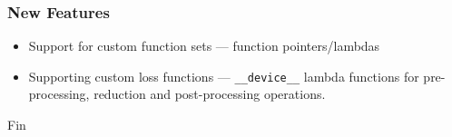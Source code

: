 \documentclass{beamer}
\begin{document}
\begin{frame}
  \frametitle{New Features}
  \begin{itemize}
    \item Support for custom function sets --- function pointers/lambdas
    \item Supporting custom loss functions --- \lstinline!__device__! lambda functions for pre-processing, reduction and post-processing operations.
  \end{itemize}
\end{frame}

\begin{frame}
\Huge{\centerline{Fin}}
\end{frame}

\end{document}
